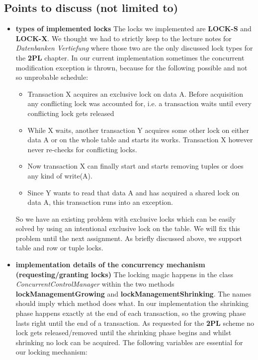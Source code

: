 \documentclass{vldb}
\begin{document}
\subsection{Points to discuss (not limited to)}
\begin{itemize}
\item \textbf{types of implemented locks} The locks we implemented are \textbf{LOCK-S} and \textbf{LOCK-X}. We thought we had to strictly keep to the lecture notes for \textit{Datenbanken Vertiefung} where those two are the only discussed lock types for the \textbf{2PL} chapter. In our current implementation sometimes the concurrent modification exception is thrown, because for the following possible and not so unprobable schedule:
\begin{itemize}
	\item Transaction X acquires an exclusive lock on data A. Before acquisition any conflicting lock was accounted for, i.e. a transaction waits until every conflicting lock gets released
	\item While X waits, another transaction Y acquires some other lock on either data A or on the whole table and starts its works. Transaction X however never re-checks for conflicting locks.
	\item Now transaction X can finally start and starts removing tuples or does any kind of write(A).
	\item Since Y wants to read that data A and has acquired a shared lock on data A, this transaction runs into an exception.
\end{itemize}
So we have an existing problem with exclusive locks which can be easily solved by using an intentional exclusive lock on the table. We will fix this problem until the next assignment. As briefly discussed above, we support table and row or tuple locks.
\item \textbf{implementation details of the concurrency mechanism (requesting/granting locks)} The locking magic happens in the class \textit{ConcurrentControlManager} within the two methods \textbf{lockManagementGrowing} and \textbf{lockManagementShrinking}. The names should imply which method does what. In our implementation the shrinking phase happens exactly at the end of each transaction, so the growing phase lasts right until the end of a transaction. As requested for the \textbf{2PL} scheme no lock gets released/removed until the shrinking phase begins and whilst shrinking no lock can be acquired. The following variables are essential for our locking mechanism:
\begin{itemize}

\end{itemize}
\end{itemize}
\end{document}
